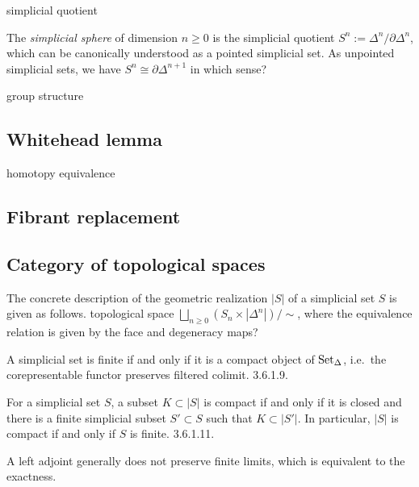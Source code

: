 \documentclass{../../../small}
\begin{document}
simplicial quotient

\begin{definition}[Spheres]
The \emph{simplicial sphere} of dimension $n\ge0$ is the simplicial quotient $S^n:=\Delta^n/\partial\Delta^n$, which can be canonically understood as a pointed simplicial set.
As unpointed simplicial sets, we have $S^n\cong\partial\Delta^{n+1}$ in which sense?
\end{definition}


\begin{theorem}
group structure
\end{theorem}


\subsection{Whitehead lemma}


homotopy equivalence


\subsection{Fibrant replacement}


\subsection{Category of topological spaces}


The concrete description of the geometric realization $|S|$ of a simplicial set $S$ is given as follows.
topological space $\bigsqcup_{n\ge0}(S_n\times|\Delta^n|)/\sim$, where the equivalence relation is given by the face and degeneracy maps?





\begin{prb}
\begin{parts}
\item
A simplicial set is finite if and only if it is a compact object of $\operatorname{Set}_\Delta$, i.e.~the corepresentable functor preserves filtered colimit. 3.6.1.9.
\item
For a simplicial set $S$, a subset $K\subset|S|$ is compact if and only if it is closed and there is a finite simplicial subset $S'\subset S$ such that $K\subset|S'|$.
In particular, $|S|$ is compact if and only if $S$ is finite. 3.6.1.11.
\end{parts}
\end{prb}

A left adjoint generally does not preserve finite limits, which is equivalent to the exactness.
\end{document}
